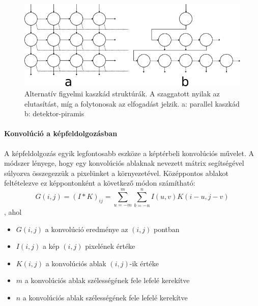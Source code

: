 \begin{figure}[h]
    \centering
    \includegraphics[width=\linewidth]{figures/alternative_cascades.png}
    \caption{Alternatív figyelmi kaszkád struktúrák. A szaggatott nyilak az elutasítást, míg a folytonosak az elfogadást jelzik. a: parallel kaszkád\cite{bo_wu_fast_2004} b: detektor-piramis \cite{goos_statistical_2002}}
    \label{fig:alternative_attentional_cascades}
\end{figure}

\paragraph{Konvolúció a képfeldolgozásban}\hfill

A képfeldolgozás egyik legfontosabb eszköze a képtérbeli konvolúciós művelet. A módszer lényege, hogy egy konvolúciós ablaknak nevezett mátrix segítségével súlyozva összegezzük a pixelünket a környezetével. Középpontos ablakot feltételezve ez képpontonként a következő módon számítható:
\begin{equation}
    G(i,j) = (I * K)_{ij} = \sum_{u = -m}^{m} \sum_{b = -n}^{n} I(u, v) K(i - u, j - v)
\end{equation},
ahol
\begin{itemize}
    \item \(G(i,j)\) a konvolúció eredménye az \((i, j)\) pontban
    \item \(I(i, j)\) a kép \((i, j)\) pixelének értéke
    \item \(K(i, j)\) a konvolúciós ablak \((i, j)\)-ik értéke
    \item \(m\) a konvolúciós ablak szélességének fele lefelé kerekítve
    \item \(n\) a konvolúciós ablak szélességének fele lefelé kerekítve
\end{itemize}

